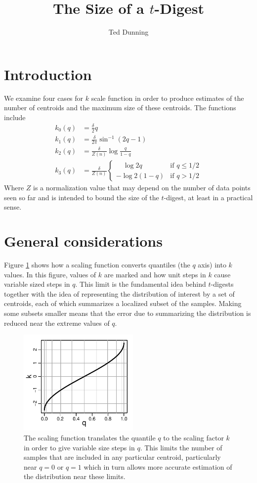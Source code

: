 \documentclass[11pt]{amsart}
\title{The Size of a $t$-Digest}
\author{Ted Dunning}
\date{}                                           %
\begin{document}
\maketitle
\section{Introduction}
We examine four cases for $k$ scale function in order to produce estimates of the number of centroids and the maximum size of these centroids. The functions include
\[
\begin{aligned}
k_0(q) &= \frac \delta 2 q \\
k_1(q) &= \frac \delta {2\pi}  \sin^{-1}(2q-1)   \\
k_2(q) &= \frac \delta {Z(n)} \log {\frac q {1-q}} \\
k_3(q) &= \frac \delta {Z(n)}\begin{cases}
\quad \log 2q & \text{if  } q \le 1/2 \\
- \log 2(1-q) & \text{if  } q > 1/2
\end{cases}
\end{aligned}
\]
Where $Z$ is a normalization value that may depend on the number of data points seen so far and is intended to bound the size of the $t$-digest, at least in a practical sense.
\section{General considerations}
Figure \ref{fig:k-q-plot-full} shows how a scaling function converts quantiles (the $q$ axis) into $k$ values. In this figure, values of $k$ are marked  and how unit steps in $k$ cause variable sized steps in $q$. This limit is the fundamental idea behind $t$-digests together with the idea of representing the distribution of interest by a set of centroids, each of which summarizes a localized subset of the samples. Making some subsets smaller means that the error due to summarizing the distribution is reduced near the extreme values of $q$.
\begin{figure}[htbp] %
   \centering
   \includegraphics[width=2.3in]{../t-digest-paper/k-q-plot.pdf} 
   \caption{The scaling function translates the quantile $q$ to the scaling factor $k$ in order to give variable size steps in $q$. This limits the number of samples that are included in any particular centroid, particularly near $q=0$ or $q=1$ which in turn allows more accurate estimation of the distribution near these limits. }
   \label{fig:k-q-plot-full}
\end{figure}
\end{document}
